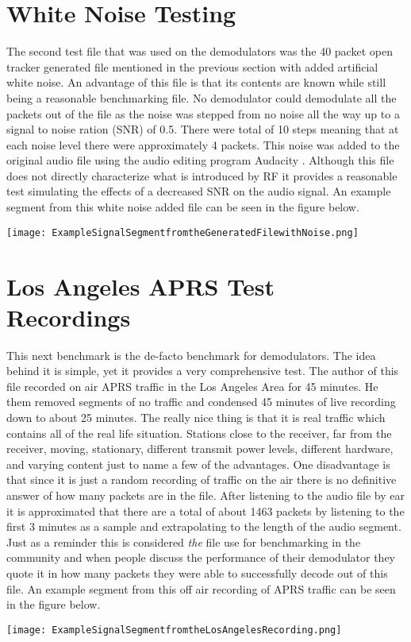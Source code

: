 \section{White Noise Testing}
The second test file that was used on the demodulators was the 40 packet open tracker generated file mentioned in the previous section with added artificial white noise. An advantage of this file is that its contents are known while still being a reasonable benchmarking file. No demodulator could demodulate all the packets out of the file as the noise was stepped from no noise all the way up to a signal to noise ration (SNR) of 0.5. There were  total of 10 steps meaning that at each noise level there were approximately 4 packets. This noise was added to the original audio file using the audio editing program Audacity \cite{Mazzoni}. Although this file does not directly characterize what is introduced by RF it provides a reasonable test simulating the effects of a decreased SNR on the audio signal. An example segment from this white noise added file can be seen in the figure below.
\begin{Figure}
  \centering
	\texttt{[image: ExampleSignalSegmentfromtheGeneratedFilewithNoise.png]} 
\end{Figure}
 
\section{Los Angeles APRS Test Recordings}
This next benchmark is the de-facto benchmark for demodulators. The idea behind it is simple, yet it provides a very comprehensive test. The author of this file recorded on air APRS traffic in the Los Angeles Area for 45 minutes. He them removed segments of no traffic and condensed 45 minutes of live recording down to about 25 minutes. The really nice thing is that it is real traffic which contains all of the real life situation. Stations close to the receiver, far from the receiver, moving, stationary, different transmit power levels, different hardware, and varying content just to name a few of the advantages. One disadvantage is that since it is just a random recording of traffic on the air there is no definitive answer of how many packets are in the file. After listening to the audio file by ear it is approximated that there are a total of about 1463 packets by listening to the first 3 minutes as a sample and extrapolating to the length of the audio segment. Just as a reminder this is considered \textit{the} file use for benchmarking in the community and when people discuss the performance of their demodulator they quote it in how many packets they were able to successfully decode out of this file. An example segment from this off air recording of APRS traffic can be seen in the figure below.
\begin{Figure}
  \centering
	\texttt{[image: ExampleSignalSegmentfromtheLosAngelesRecording.png]} 
\end{Figure}

